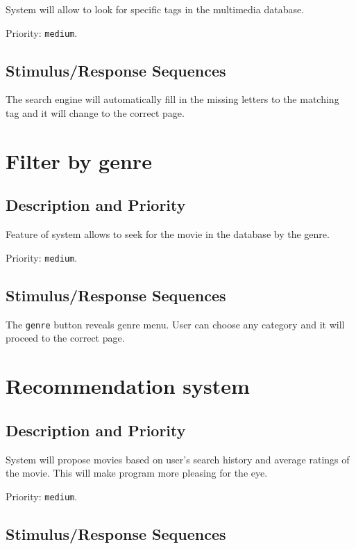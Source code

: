 \documentclass{scrreprt}
\begin{document}
System will allow to look for specific tags in the multimedia database.

Priority: \verb|medium|.

\subsection {Stimulus/Response Sequences}

The search engine will automatically fill in the missing letters to the matching tag and it will change to the correct page. 

\section{Filter by genre}

\subsection{Description and Priority}

Feature of system allows to seek for the movie in the database by the genre.

Priority: \verb|medium|.

\subsection{Stimulus/Response Sequences}

The \verb|genre| button reveals genre menu. User can choose any category and it will proceed to the correct page.  

\section{ Recommendation system}

\subsection{Description and Priority}


System will propose movies based on user's search history and average ratings of the movie. This will make program more pleasing for the eye.

Priority: \verb|medium|.

\subsection{Stimulus/Response Sequences}
\end{document}
